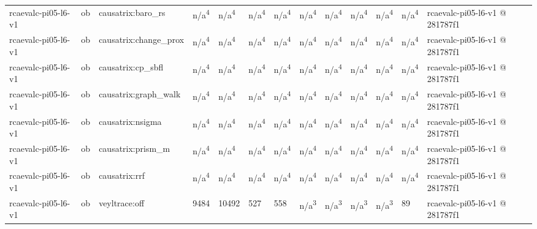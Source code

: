 \begin{table}[t]
\begin{tabular}{lllllllllllll}
rcaevalc-pi05-l6-v1 & ob & causatrix:baro\_rs & n/a\textsuperscript{4} & n/a\textsuperscript{4} & n/a\textsuperscript{4} & n/a\textsuperscript{4} & n/a\textsuperscript{4} & n/a\textsuperscript{4} & n/a\textsuperscript{4} & n/a\textsuperscript{4} & n/a\textsuperscript{4} & rcaevalc-pi05-l6-v1 @ 281787f1 \\
rcaevalc-pi05-l6-v1 & ob & causatrix:change\_prox & n/a\textsuperscript{4} & n/a\textsuperscript{4} & n/a\textsuperscript{4} & n/a\textsuperscript{4} & n/a\textsuperscript{4} & n/a\textsuperscript{4} & n/a\textsuperscript{4} & n/a\textsuperscript{4} & n/a\textsuperscript{4} & rcaevalc-pi05-l6-v1 @ 281787f1 \\
rcaevalc-pi05-l6-v1 & ob & causatrix:cp\_sbfl & n/a\textsuperscript{4} & n/a\textsuperscript{4} & n/a\textsuperscript{4} & n/a\textsuperscript{4} & n/a\textsuperscript{4} & n/a\textsuperscript{4} & n/a\textsuperscript{4} & n/a\textsuperscript{4} & n/a\textsuperscript{4} & rcaevalc-pi05-l6-v1 @ 281787f1 \\
rcaevalc-pi05-l6-v1 & ob & causatrix:graph\_walk & n/a\textsuperscript{4} & n/a\textsuperscript{4} & n/a\textsuperscript{4} & n/a\textsuperscript{4} & n/a\textsuperscript{4} & n/a\textsuperscript{4} & n/a\textsuperscript{4} & n/a\textsuperscript{4} & n/a\textsuperscript{4} & rcaevalc-pi05-l6-v1 @ 281787f1 \\
rcaevalc-pi05-l6-v1 & ob & causatrix:nsigma & n/a\textsuperscript{4} & n/a\textsuperscript{4} & n/a\textsuperscript{4} & n/a\textsuperscript{4} & n/a\textsuperscript{4} & n/a\textsuperscript{4} & n/a\textsuperscript{4} & n/a\textsuperscript{4} & n/a\textsuperscript{4} & rcaevalc-pi05-l6-v1 @ 281787f1 \\
rcaevalc-pi05-l6-v1 & ob & causatrix:prism\_m & n/a\textsuperscript{4} & n/a\textsuperscript{4} & n/a\textsuperscript{4} & n/a\textsuperscript{4} & n/a\textsuperscript{4} & n/a\textsuperscript{4} & n/a\textsuperscript{4} & n/a\textsuperscript{4} & n/a\textsuperscript{4} & rcaevalc-pi05-l6-v1 @ 281787f1 \\
rcaevalc-pi05-l6-v1 & ob & causatrix:rrf & n/a\textsuperscript{4} & n/a\textsuperscript{4} & n/a\textsuperscript{4} & n/a\textsuperscript{4} & n/a\textsuperscript{4} & n/a\textsuperscript{4} & n/a\textsuperscript{4} & n/a\textsuperscript{4} & n/a\textsuperscript{4} & rcaevalc-pi05-l6-v1 @ 281787f1 \\
rcaevalc-pi05-l6-v1 & ob & veyltrace:off & 9484 & 10492 & 527 & 558 & n/a\textsuperscript{3} & n/a\textsuperscript{3} & n/a\textsuperscript{3} & n/a\textsuperscript{3} & 89 & rcaevalc-pi05-l6-v1 @ 281787f1 \\

\end{tabular}
\end{table}
